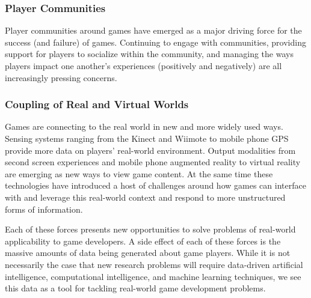 \documentclass[conference]{IEEEtran}
\begin{document}
\subsubsection{Player Communities}
Player communities around games have emerged as a major driving force for the success (and failure) of games. Continuing to engage with communities, providing support for players to socialize within the community, and managing the ways players impact one another's experiences (positively and negatively) are all increasingly pressing concerns.

\subsubsection{Coupling of Real and Virtual Worlds}
Games are connecting to the real world in new and more widely used ways. Sensing systems ranging from the Kinect and Wiimote to mobile phone GPS provide more data on players' real-world environment. Output modalities from second screen experiences and mobile phone augmented reality to virtual reality are emerging as new ways to view game content. At the same time these technologies have introduced a host of challenges around how games can interface with and leverage this real-world context and respond to more unstructured forms of information.


Each of these forces presents new opportunities to solve problems of real-world applicability to game developers.
A side effect of each of these forces is the massive amounts of data being generated about game players.
While it is not necessarily the case that new research problems will require data-driven artificial intelligence, computational intelligence, and machine learning techniques, we see this data as a tool for tackling real-world game development problems.
\end{document}
